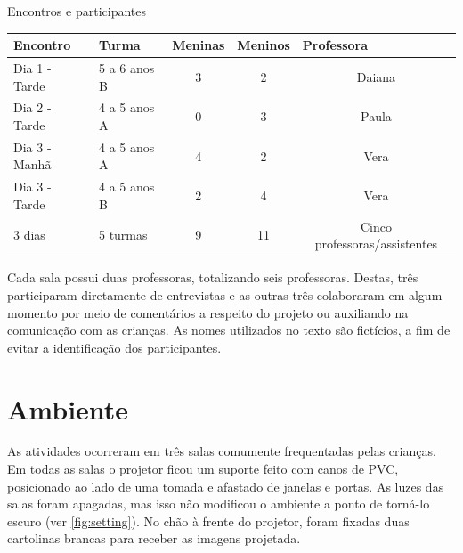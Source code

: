  \begin{quadro}[!h]
 		\setlength{\extrarowheight}{5pt}
        \begin{center}
        \caption{Encontros e participantes}
        \label{quadro:participants}
        \begin{tabular}{@{}llccc@{}}
            \toprule
            Encontro & Turma & \multicolumn{1}{l}{Meninas} & \multicolumn{1}{l}{Meninos} & \multicolumn{1}{l}{Professora} \\ \midrule
            Dia 1 - Tarde & 5 a 6 anos B & 3 & 2 & Daiana \\
            Dia 2 - Tarde & 4 a 5 anos A & 0 & 3 & Paula \\
            Dia 3 - Manhã & 4 a 5 anos A & 4 & 2 & Vera \\
            Dia 3 - Tarde & 4 a 5 anos B & 2 & 4 & Vera \\ \midrule
            3 dias        & 5 turmas     & 9 & 11 & Cinco professoras/assistentes \\ \bottomrule 
            \end{tabular}
        \end{center}
        \sourceauthor
    \end{quadro}

Cada sala possui duas professoras, totalizando seis professoras. Destas, três participaram diretamente de entrevistas e as outras três colaboraram em algum momento por meio de comentários a respeito do projeto ou auxiliando na comunicação com as crianças. As nomes utilizados no texto são fictícios, a fim de evitar a identificação dos participantes.

\section{Ambiente}
As atividades ocorreram em três salas comumente frequentadas pelas crianças. Em todas as salas o projetor ficou um suporte feito com canos de PVC, posicionado ao lado de uma tomada e afastado de janelas e portas. As luzes das salas foram apagadas, mas isso não modificou o ambiente a ponto de torná-lo escuro (ver \autoref{fig:setting}). No chão à frente do projetor, foram fixadas duas cartolinas brancas para receber as imagens projetada.

